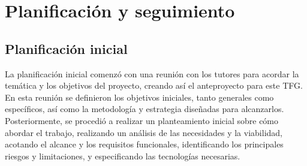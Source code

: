 \section{Planificación y seguimiento}
\label{sec:planificacion_seguimiento}

\subsection{Planificación inicial}
\label{sec:planificacion_inicial}

La planificación inicial comenzó con una reunión con los tutores para acordar la temática y los objetivos del proyecto, creando así el 
anteproyecto para este TFG. En esta reunión se definieron los objetivos iniciales, tanto generales como específicos, así como la metodología 
y estrategia diseñadas para alcanzarlos. Posteriormente, se procedió a realizar un planteamiento inicial sobre cómo abordar el trabajo, 
realizando un análisis de las necesidades y la viabilidad, acotando el alcance y los requisitos funcionales, identificando los principales 
riesgos y limitaciones, y especificando las tecnologías necesarias.

